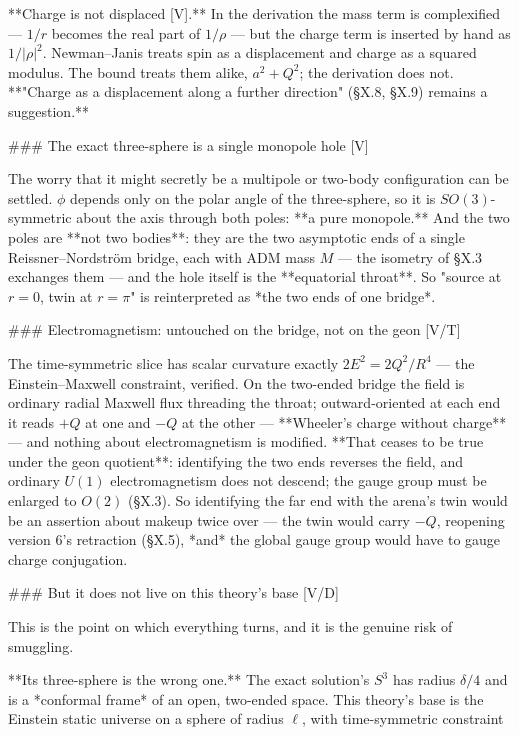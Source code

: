 **Charge is not displaced [V].** In the derivation the mass term is complexified — $1/r$ becomes the real part of $1/\rho$ — but the charge term is inserted by hand as $1/|\rho|^2$. Newman–Janis treats spin as a displacement and charge as a squared modulus. The bound treats them alike, $a^2+Q^2$; the derivation does not. **"Charge as a displacement along a further direction" (§X.8, §X.9) remains a suggestion.**

### The exact three-sphere is a single monopole hole [V]

The worry that it might secretly be a multipole or two-body configuration can be settled. $\phi$ depends only on the polar angle of the three-sphere, so it is $SO(3)$-symmetric about the axis through both poles: **a pure monopole.** And the two poles are **not two bodies**: they are the two asymptotic ends of a single Reissner–Nordström bridge, each with ADM mass $M$ — the isometry of §X.3 exchanges them — and the hole itself is the **equatorial throat**. So "source at $r = 0$, twin at $r = \pi$" is reinterpreted as *the two ends of one bridge*.

### Electromagnetism: untouched on the bridge, not on the geon [V/T]

The time-symmetric slice has scalar curvature exactly $2E^2 = 2Q^2/R^4$ — the Einstein–Maxwell constraint, verified. On the two-ended bridge the field is ordinary radial Maxwell flux threading the throat; outward-oriented at each end it reads $+Q$ at one and $-Q$ at the other — **Wheeler's charge without charge** — and nothing about electromagnetism is modified. **That ceases to be true under the geon quotient**: identifying the two ends reverses the field, and ordinary $U(1)$ electromagnetism does not descend; the gauge group must be enlarged to $O(2)$ (§X.3). So identifying the far end with the arena's twin would be an assertion about makeup twice over — the twin would carry $-Q$, reopening version 6's retraction (§X.5), *and* the global gauge group would have to gauge charge conjugation.

### But it does not live on this theory's base [V/D]

This is the point on which everything turns, and it is the genuine risk of smuggling.

**Its three-sphere is the wrong one.** The exact solution's $S^3$ has radius $\delta/4$ and is a *conformal frame* of an open, two-ended space. This theory's base is the Einstein static universe on a sphere of radius $\ell$, with time-symmetric constraint

